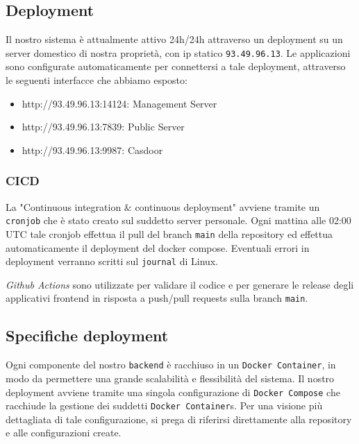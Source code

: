 \documentclass{article}
\begin{document}
\subsection{Deployment}
Il nostro sistema è attualmente attivo 24h/24h attraverso un deployment su un server domestico di nostra proprietà, con ip statico \texttt{93.49.96.13}.
Le applicazioni sono configurate automaticamente per connettersi a tale deployment, attraverso le seguenti interfacce che abbiamo esposto:
\begin{itemize}
	\item http://93.49.96.13:14124: Management Server
	\item http://93.49.96.13:7839: Public Server
	\item http://93.49.96.13:9987: Casdoor
\end{itemize}

\subsubsection{CICD}
La "Continuous integration \& continuous deployment" avviene tramite un \texttt{cronjob} che è stato creato sul suddetto server personale.
Ogni mattina alle 02:00 UTC tale cronjob effettua il pull del branch \texttt{main} della repository ed effettua automaticamente il deployment del docker compose. 
Eventuali errori in deployment verranno scritti sul \texttt{journal} di Linux.

\textit{Github Actions} sono utilizzate per validare il codice e per generare le release degli applicativi frontend in risposta a push/pull requests sulla branch \texttt{main}. 

\subsection{Specifiche deployment}
Ogni componente del nostro \texttt{backend} è racchiuso in un \texttt{Docker Container}, in modo da permettere una grande scalabilità e flessibilità del sistema.
Il nostro deployment avviene tramite una singola configurazione di \texttt{Docker Compose} che racchiude la gestione dei suddetti \texttt{Docker Container}s.
Per una visione più dettagliata di tale configurazione, si prega di riferirsi direttamente alla repository e alle configurazioni create.
\end{document}
